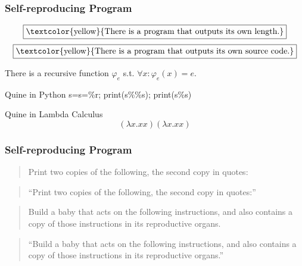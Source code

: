 \documentclass[UTF8,11pt,colorlinks,compress,openany]{beamer}%
\begin{document}
\begin{frame}\frametitle{Self-reproducing Program}
	\[\fbox{\textcolor{yellow}{There is a program that outputs its own length.}}\]
	\[\fbox{\textcolor{yellow}{There is a program that outputs its own source code.}}\]
	\begin{corollary}
		There is a recursive function $\varphi_e$ s.t. $\forall x: \varphi_e(x)=e$.
	\end{corollary}
\begin{block}{Quine in Python}
s=\textquotesingle s=\%r; print(s\%\%s)\textquotesingle; print(s\%s)
\end{block}
\begin{block}{Quine in Lambda Calculus}
\[(\lambda x.xx)(\lambda x.xx)\]
\end{block}
\end{frame}

\begin{frame}\frametitle{Self-reproducing Program}
\begin{block}{}
	\begin{quote}
		Print two copies of the following, the second copy in quotes:
	\end{quote}
	\begin{quote}
		``Print two copies of the following, the second copy in quotes:''
	\end{quote}
\end{block}
	\centerline{\fbox{\textcolor{green}{DNA / mutation / evolution}}}
\begin{block}{}
	\begin{quote}
		Build a baby that acts on the following instructions, and also contains a copy of those instructions in its reproductive organs.
	\end{quote}
	\begin{quote}
		``Build a baby that acts on the following instructions, and also contains a copy of those instructions in its reproductive organs.''
	\end{quote}
\end{block}
\end{frame}
\end{document}
